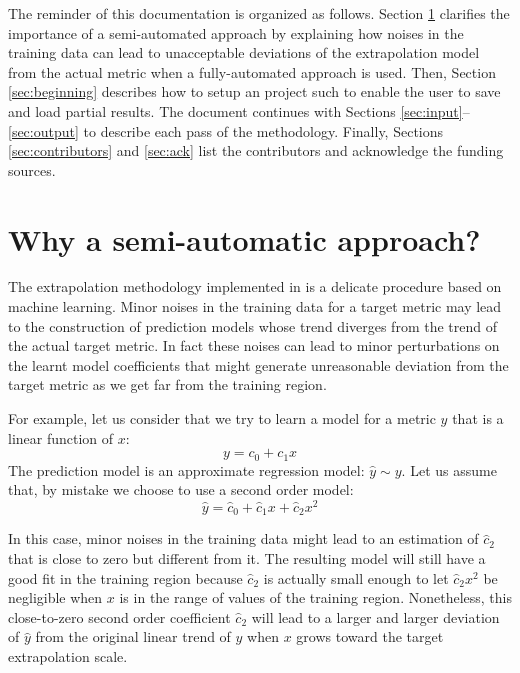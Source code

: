 \documentclass[a4paper, 10pt]{article}
\begin{document}
The reminder of this documentation is organized as follows. Section \ref{sec:semiauto} clarifies the importance of a
semi-automated approach by explaining how noises in the training data can lead to unacceptable deviations of the extrapolation
model from the actual metric when a fully-automated approach is used. Then, Section \ref{sec:beginning} describes
how to setup an \ex project such to enable the user to save and load partial results. The document continues with Sections
\ref{sec:input}--\ref{sec:output} to describe each pass of the \ex methodology. Finally, Sections \ref{sec:contributors}
and \ref{sec:ack} list the contributors and acknowledge the funding sources.


\section{Why a semi-automatic approach?}
\label{sec:semiauto}

The extrapolation methodology implemented in \ex is a delicate procedure based on machine learning. Minor noises in the training
data for a target metric may lead to the construction of prediction models whose trend diverges from the trend of the actual target metric.
In fact these noises can lead to minor perturbations on the learnt model coefficients that might generate unreasonable deviation
from the target metric as we get far from the training region.

For example, let us consider that we try to learn a model for a metric $y$ that is a linear function of $x$:
\begin{equation}
 y = c_0 + c_1 x
\end{equation}
The prediction model is an approximate regression model: $\hat{y}\sim y$.
Let us assume that, by mistake we choose to use a second order model:
\begin{equation}
 \hat{y} = \hat{c}_0 + \hat{c}_1 x + \hat{c}_2 x^2
\end{equation}


In this case, minor noises in the training data might lead to an estimation of $\hat{c}_2$ that is close to zero but different from it.
The resulting model will still have a good fit in the training region because $\hat{c}_2$ is actually small enough to let
$\hat{c}_2 x^2$ be negligible when $x$ is in the range of values of the training region.
Nonetheless, this close-to-zero second order coefficient $\hat{c}_2$ will lead to a larger and larger deviation of $\hat{y}$
from the original linear trend of $y$ when $x$ grows toward the target extrapolation scale.
\end{document}
